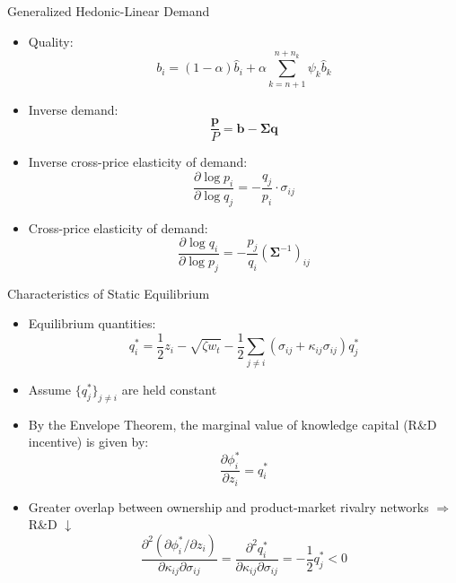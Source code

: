 \documentclass[
  10pt,
  aspectratio=169,   %
]{beamer}
\theoremstyle{plain}
\begin{document}
\begin{frame}{Generalized Hedonic-Linear Demand \citep{Pellegrino2024-dn}}
  \begin{itemize}
    \item Quality:
          \[
            b_{i}=\left(1-\alpha\right)\hat{b}_{i}+\alpha\sum_{k=n+1}^{n+n_{k}}\psi_{k}\hat{b}_{k}
          \]
    \item Inverse demand:
          \[
            \frac{\bm{p}}{P}=\bm{b}-\bm{\Sigma}\bm{q}
          \]
    \item Inverse cross-price elasticity of demand:
          \[
            \frac{\partial\log p_{i}}{\partial\log q_{j}}=-\frac{q_{j}}{p_{i}}\cdot\sigma_{ij}
          \]
    \item Cross-price elasticity of demand:
          \[
            \frac{\partial\log q_{i}}{\partial\log p_{j}}=-\frac{p_{j}}{q_{i}}(\bm{\Sigma}^{-1})_{ij}
          \]
  \end{itemize}
\end{frame}

\begin{frame}{Characteristics of Static Equilibrium}
  \label{static_equilibrium}
  \begin{itemize}
    \item Equilibrium quantities:
          \[q_i^* = \frac{1}{2} z_i - \sqrt{\zeta w_t} - \frac{1}{2}\sum_{j \neq i} (\sigma_{ij} + \kappa_{ij} \sigma_{ij}) q_j^* \]
    \item Assume $\{q^*_{j}\}_{j\neq i}$ are held constant 
    \item By the Envelope Theorem, the marginal value of knowledge capital (R\&D incentive) is given by:
          \[
            \frac{\partial \phi_i^*}{\partial z_i} = q_i^*
          \]
    \item Greater overlap between ownership and product-market rivalry networks $\Longrightarrow$ R\&D $\downarrow$
          \[  \frac{\partial^2 (\partial \phi_i^* / \partial z_i)}{\partial \kappa_{ij} \partial \sigma_{ij}} = \frac{\partial^2  q_i^*}{\partial \kappa_{ij} \partial \sigma_{ij}}= -\frac{1}{2}q_j^* < 0\]
  \end{itemize}
  \hyperlink{static_game}{}
\end{frame}
\end{document}
